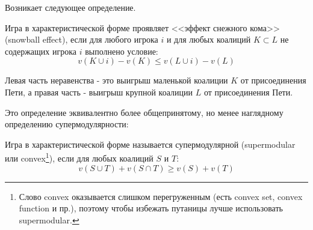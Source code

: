 Возникает следующее определение.
\begin{mydef}
Игра в характеристической форме проявляет <<эффект снежного кома>> (snowball effect), если для любого игрока $i$ и для любых коалиций $K\subset L$ не содержащих игрока $i$ выполнено условие:
\begin{equation}
v(K\cup i)-v(K)\leq v(L\cup i)-v(L)
\end{equation}
\end{mydef}

Левая часть неравенства - это выигрыш маленькой коалиции $K$ от присоединения Пети, а правая часть - выигрыш крупной коалиции $L$ от присоединения Пети.

Это определение эквивалентно более общепринятому, но менее наглядному определению супермодулярности:
\begin{mydef}
Игра в характеристической форме называется супермодулярной  (supermodular или convex\footnote{Слово convex оказывается слишком перегруженным (есть convex set, convex function и пр.), поэтому чтобы избежать путаницы лучше использовать supermodular.}), если для любых коалиций $S$ и $T$:
\begin{equation}
v(S\cup T)+v(S\cap T)\geq v(S)+v(T)
\end{equation}
\end{mydef}

